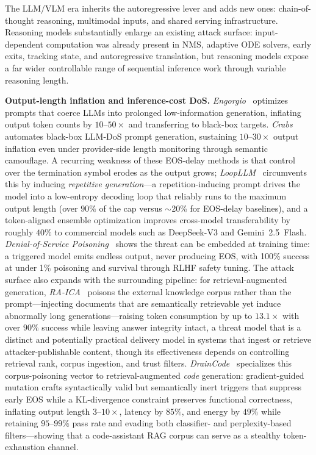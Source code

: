 \documentclass[acmsmall,screen,review,nonacm]{acmart}
\begin{document}
The LLM/VLM era inherits the autoregressive lever and adds new ones: chain-of-thought reasoning, multimodal inputs, and shared serving infrastructure. Reasoning models substantially enlarge an existing attack surface: input-dependent computation was already present in NMS, adaptive ODE solvers, early exits, tracking state, and autoregressive translation, but reasoning models expose a far wider controllable range of sequential inference work through variable reasoning length.

\noindent\textbf{Output-length inflation and inference-cost DoS.}
\emph{Engorgio}~\cite{dong2024engorgio} optimizes prompts that coerce LLMs into prolonged low-information generation, inflating output token counts by $10$--$50\times$ and transferring to black-box targets. \emph{Crabs}~\cite{zhang2025crabs} automates black-box LLM-DoS prompt generation, sustaining $10$--$30\times$ output inflation even under provider-side length monitoring through semantic camouflage. A recurring weakness of these EOS-delay methods is that control over the termination symbol erodes as the output grows; \emph{LoopLLM}~\cite{li2026loopllm} circumvents this by inducing \emph{repetitive generation}---a repetition-inducing prompt drives the model into a low-entropy decoding loop that reliably runs to the maximum output length (over $90\%$ of the cap versus $\sim$20\% for EOS-delay baselines), and a token-aligned ensemble optimization improves cross-model transferability by roughly $40\%$ to commercial models such as DeepSeek-V3 and Gemini~2.5~Flash. \emph{Denial-of-Service Poisoning}~\cite{gao2024dospoisoning} shows the threat can be embedded at training time: a triggered model emits endless output, never producing EOS, with 100\% success at under 1\% poisoning and survival through RLHF safety tuning. The attack surface also expands with the surrounding pipeline: for retrieval-augmented generation, \emph{RA-ICA}~\cite{liu2026inference} poisons the external knowledge corpus rather than the prompt---injecting documents that are semantically retrievable yet induce abnormally long generations---raising token consumption by up to $13.1\times$ with over $90\%$ success while leaving answer integrity intact, a threat model that is a distinct and potentially practical delivery model in systems that ingest or retrieve attacker-publishable content, though its effectiveness depends on controlling retrieval rank, corpus ingestion, and trust filters. \emph{DrainCode}~\cite{wang2025draincode} specializes this corpus-poisoning vector to retrieval-augmented \emph{code} generation: gradient-guided mutation crafts syntactically valid but semantically inert triggers that suppress early EOS while a KL-divergence constraint preserves functional correctness, inflating output length $3$--$10\times$, latency by $85\%$, and energy by $49\%$ while retaining $95$--$99\%$ pass rate and evading both classifier- and perplexity-based filters---showing that a code-assistant RAG corpus can serve as a stealthy token-exhaustion channel.
\end{document}
